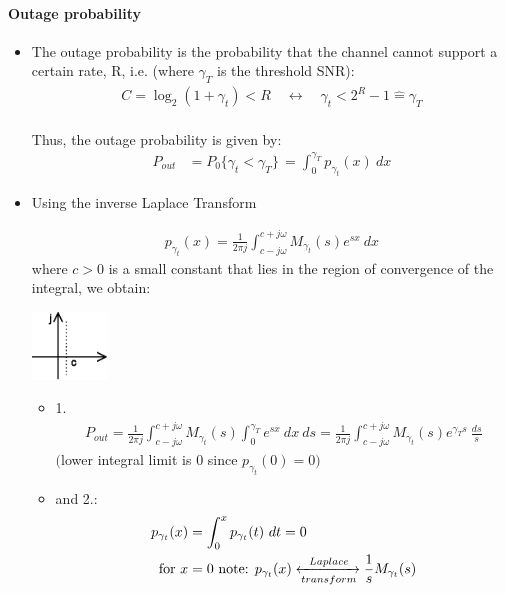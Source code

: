 \documentclass[a4paper, 10pt]{article}
\begin{document}
\paragraph{Outage probability}
\begin{itemize}
	\item The outage probability is the probability that the channel cannot support a certain rate, R, i.e. (where \begin{math} \gamma_T \end{math} is the threshold SNR):
		\begin{align*}
			C = \log_2(1+\gamma_t) < R \quad \leftrightarrow \quad \gamma_t < 2^R - 1 \hat{=} \gamma_T
		\end{align*}\\
		Thus, the outage probability is given by:
		\begin{align*}
			P_{out} &= P_0 \{\gamma_t <\gamma_T\}  \,= \int_{0}^{\gamma_T}p_{\gamma_t}(x)~dx
		\end{align*}
\item Using the inverse Laplace Transform\\
\begin{minipage}[hbt]{7cm}
	\centering
		\begin{align*}
			p_{\gamma  _t}(x) = \frac{1}{2\pi j}\int_{c-j\omega}^{c+j\omega}M_{\gamma _t}(s)e^{sx}~dx
		\end{align*}
	where \begin{math} c > 0\end{math} is a small constant that lies in the region of convergence of the integral, we obtain:
\end{minipage}
\hfill
\begin{minipage}[hbt]{5cm}
	\centering
	\includegraphics[width=2cm]{SIMO_Konstante_c}
\end{minipage}

\begin{itemize}
	\item 1.
			\begin{align*}
				P_{out} = \frac{1}{2\pi j}\int_{c-j\omega}^{c+j\omega}M_{\gamma _t}(s)\int_{0}^{\gamma _T}e^{sx}~dx~ds = \frac{1}{2\pi j}\int_{c-j\omega}^{c+j\omega}M_{\gamma _t}(s)e^{\gamma _Ts}~\frac{ds}{s}
			\end{align*}
			\begin{math}\bigl (\end{math}lower integral limit is 0 since \begin{math}p_{\gamma _t}(0) = 0 \bigr )\end{math}
	\item and 2.:
		\begin{align*}
			p_{\gamma _t} (x) &= \int_{0}^{x} p_{\gamma _t}(t) ~dt = 0\\		
		\text{for } x &= 0 \text{ note: } p_{\gamma _t}(x) \xleftrightarrow [transform]{Laplace} \frac{1}{s}M_{\gamma _t}(s)
		\end{align*}
	\end{itemize}
\end{itemize}
\end{document}
